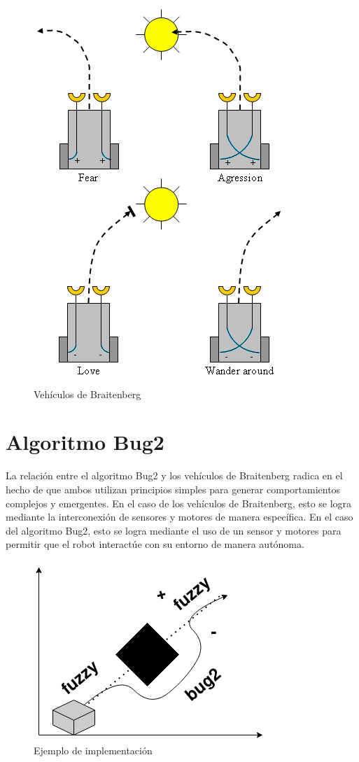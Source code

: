 \documentclass[oneside,onecolumn]{article}
\begin{document}
\begin{figure}[h]
  \centering
  \includegraphics[scale=0.4]{graficos/braitenberg.png}
  \caption{Vehículos de Braitenberg}
\end{figure}

\newpage
\section{Algoritmo Bug2}

La relación entre el algoritmo Bug2 y los vehículos de Braitenberg radica en el hecho de que ambos utilizan principios simples para generar comportamientos complejos y emergentes. En el caso de los vehículos de Braitenberg, esto se logra mediante la interconexión de sensores y motores de manera específica. En el caso del algoritmo Bug2, esto se logra mediante el uso de un sensor y motores para permitir que el robot interactúe con su entorno de manera autónoma.

\begin{figure}[h]
  \centering
  \includegraphics[scale=0.7]{graficos/bug2.png}
  \caption{Ejemplo de implementación}
\end{figure}
\end{document}
